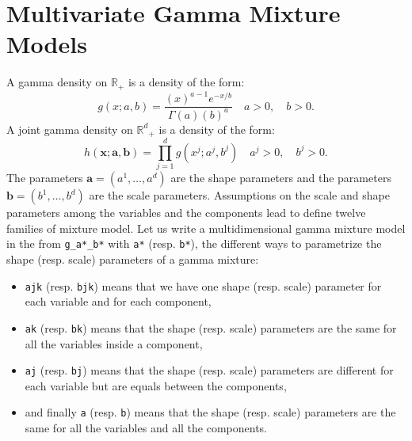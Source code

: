 \documentclass[a4paper,10pt]{article}
\newcommand{\R}{\mathbb{R}}
\newcommand{\Rd}{{\mathbb{R}^d}}
\newcommand{\ba}{\mathbf{a}}
\newcommand{\bb}{\mathbf{b}}
\newcommand{\bx}{\mathbf{x}}
\begin{document}
\section{Multivariate Gamma Mixture Models}

A gamma density on $\R_+$ is a density of the form:
\begin{equation}\label{law::gamma-density}
g(x;a,b) = \frac{ \left(x\right)^{a-1} e^{-x/b}}{\Gamma(a) \left(b\right)^{a}} \quad a>0, \quad b>0.
\end{equation}
A joint gamma density on $\Rd_+$ is a density of the form:
\begin{equation}\label{law::joint-gamma-density}
h(\bx;\ba,\bb) = \prod_{j=1}^d g(x^j;a^j,b^j) \quad a^j>0, \quad b^j>0.
\end{equation}
The parameters $\ba=(a^1,\ldots,a^d)$ are the shape parameters and the parameters $\bb=(b^1,\ldots,b^d)$ are the
scale parameters. Assumptions on the scale and shape parameters among the variables and the components
lead to define twelve families of mixture model. Let us write a multidimensional gamma mixture model in the from \verb+g_a*_b*+
with \verb+a*+ (resp. \verb+b*+), the different ways to parametrize the shape (resp. scale) parameters of a gamma mixture:
\begin{itemize}
\item \verb+ajk+ (resp. \verb+bjk+) means that we have one shape (resp. scale) parameter for each variable and for each component,
\item \verb+ak+ (resp. \verb+bk+) means that the shape (resp. scale) parameters are the same for all the variables inside a component,
\item \verb+aj+ (resp. \verb+bj+) means that the shape (resp. scale) parameters are different for each variable but are equals between the components,
\item and finally \verb+a+ (resp. \verb+b+) means that the shape (resp. scale) parameters are the same for all the variables and all the components.
\end{itemize}
\end{document}
